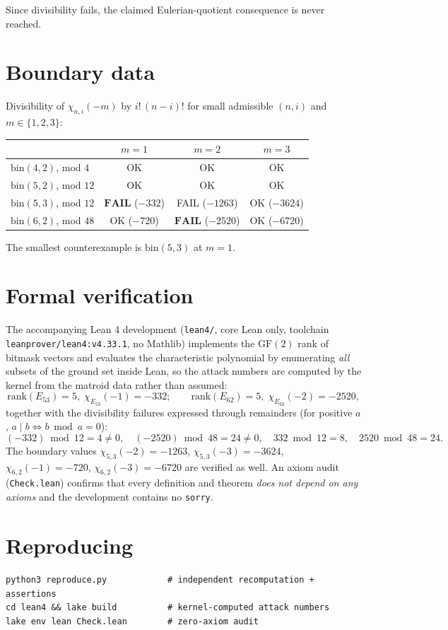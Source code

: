 \documentclass[11pt]{article}
\begin{document}
Since divisibility fails, the claimed Eulerian-quotient consequence is never
reached.

\section{Boundary data}

Divisibility of $\chi_{n,i}(-m)$ by $i!\,(n-i)!$ for small admissible
$(n,i)$ and $m \in \{1,2,3\}$:

\begin{center}
\begin{tabular}{lccc}
\toprule
 & $m=1$ & $m=2$ & $m=3$ \\
\midrule
$\mathrm{bin}(4,2)$, mod $4$   & OK & OK & OK \\
$\mathrm{bin}(5,2)$, mod $12$  & OK & OK & OK \\
$\mathrm{bin}(5,3)$, mod $12$  & $\mathbf{FAIL}$ ($-332$) & FAIL ($-1263$) & OK ($-3624$) \\
$\mathrm{bin}(6,2)$, mod $48$  & OK ($-720$)  & $\mathbf{FAIL}$ ($-2520$) & OK ($-6720$) \\
\bottomrule
\end{tabular}
\end{center}

The smallest counterexample is $\mathrm{bin}(5,3)$ at $m=1$.

\section{Formal verification}

The accompanying Lean 4 development (\texttt{lean4/}, core Lean only, toolchain
\texttt{leanprover/lean4:v4.33.1}, no Mathlib) implements the $\mathrm{GF}(2)$
rank of bitmask vectors and evaluates the characteristic polynomial by
enumerating \emph{all} subsets of the ground set inside Lean, so the attack
numbers are computed by the kernel from the matroid data rather than assumed:
\[
\mathrm{rank}(E_{53}) = 5,\; \chi_{E_{53}}(-1) = -332; \qquad
\mathrm{rank}(E_{62}) = 5,\; \chi_{E_{62}}(-2) = -2520,
\]
together with the divisibility failures expressed through remainders (for
positive $a$, $a \mid b \iff b \bmod a = 0$):
\[
(-332) \bmod 12 = 4 \neq 0, \quad (-2520) \bmod 48 = 24 \neq 0, \quad
332 \bmod 12 = 8, \quad 2520 \bmod 48 = 24 .
\]
The boundary values $\chi_{5,3}(-2) = -1263$, $\chi_{5,3}(-3) = -3624$,
$\chi_{6,2}(-1) = -720$, $\chi_{6,2}(-3) = -6720$ are verified as well.  An
axiom audit (\texttt{Check.lean}) confirms that every definition and theorem
\emph{does not depend on any axioms} and the development contains no
\texttt{sorry}.

\section{Reproducing}

\begin{verbatim}
python3 reproduce.py            # independent recomputation + assertions
cd lean4 && lake build          # kernel-computed attack numbers
lake env lean Check.lean        # zero-axiom audit
\end{verbatim}
\end{document}
